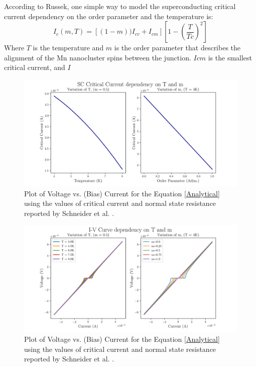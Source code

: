 \documentclass[12pt]{article}
\begin{document}
According to Russek, one simple way to model the superconducting critical current dependency on the order parameter and the temperature is:
$$
 I_{c}(m, T) = [(1-m))I_{cv} + I_{cm}]\left[1-\left(\frac{T}{Tc}\right)^{2}\right]
$$
Where $T$ is the temperature and $m$ is the order parameter that describes the alignment of the Mn nanocluster spins between the junction. $Icm$ is the smallest critical current, and $I$

\begin{figure}[ht]
    \centering
    \includegraphics[scale=0.65]{SC_SCDependencyOnMT.png}
    \caption{Plot of Voltage vs. (Bias) Current for the Equation \ref{Analytical} using the values of critical current and normal state resistance reported by Schneider et al. \cite{MAINREF}.}
    \label{SC_SC}
\end{figure}

\begin{figure}[ht]
    \centering
    \includegraphics[scale=0.65]{IV_SCDependencyOnMT.png}
    \caption{Plot of Voltage vs. (Bias) Current for the Equation \ref{Analytical} using the values of critical current and normal state resistance reported by Schneider et al. \cite{MAINREF}.}
    \label{IV_SC}
\end{figure}
\end{document}
